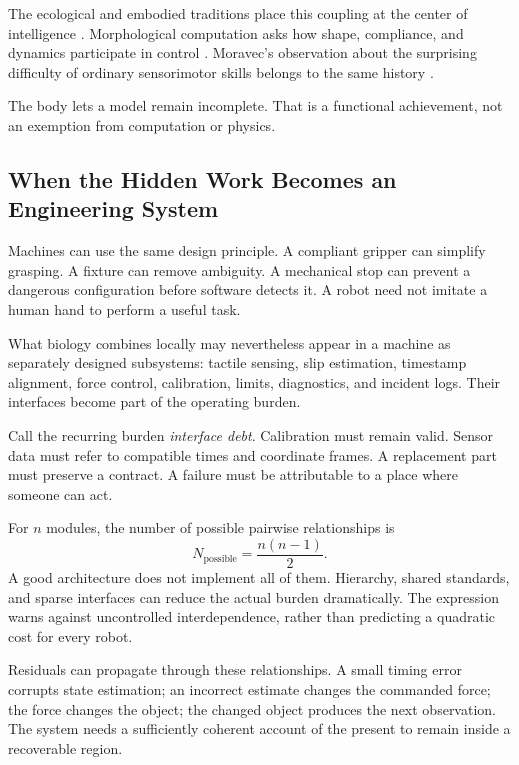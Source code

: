 The ecological and embodied traditions place this coupling at the center of intelligence \cite{gibson1979,varela1991,gibsonpick2000}. Morphological computation asks how shape, compliance, and dynamics participate in control \cite{pfeifer2007,pfeiferbongard2006,hauser2011}. Moravec's observation about the surprising difficulty of ordinary sensorimotor skills belongs to the same history \cite{moravec1988}.

The body lets a model remain incomplete. That is a functional achievement, not an exemption from computation or physics.

\subsection{When the Hidden Work Becomes an Engineering System}

Machines can use the same design principle. A compliant gripper can simplify grasping. A fixture can remove ambiguity. A mechanical stop can prevent a dangerous configuration before software detects it. A robot need not imitate a human hand to perform a useful task.

What biology combines locally may nevertheless appear in a machine as separately designed subsystems: tactile sensing, slip estimation, timestamp alignment, force control, calibration, limits, diagnostics, and incident logs. Their interfaces become part of the operating burden.

Call the recurring burden \emph{interface debt}. Calibration must remain valid. Sensor data must refer to compatible times and coordinate frames. A replacement part must preserve a contract. A failure must be attributable to a place where someone can act.

For $n$ modules, the number of possible pairwise relationships is
\begin{equation}
 N_{\mathrm{possible}}=\frac{n(n-1)}{2}.
\end{equation}
A good architecture does not implement all of them. Hierarchy, shared standards, and sparse interfaces can reduce the actual burden dramatically. The expression warns against uncontrolled interdependence, rather than predicting a quadratic cost for every robot.

Residuals can propagate through these relationships. A small timing error corrupts state estimation; an incorrect estimate changes the commanded force; the force changes the object; the changed object produces the next observation. The system needs a sufficiently coherent account of the present to remain inside a recoverable region.

